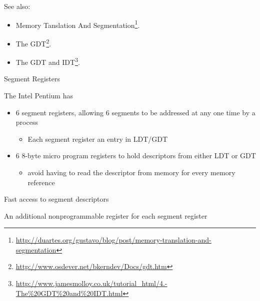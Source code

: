 See also:
\begin{itemize}
\item Memory Tanslation And Segmentation\footnote{\url{http://duartes.org/gustavo/blog/post/memory-translation-and-segmentation}}.
\item The GDT\footnote{\url{http://www.osdever.net/bkerndev/Docs/gdt.htm}}.
\item The GDT and IDT\footnote{\url{http://www.jamesmolloy.co.uk/tutorial_html/4.-The\%20GDT\%20and\%20IDT.html}}.
\end{itemize}

\begin{frame}{Segment Registers}
  \begin{iblock}{The Intel Pentium has}
    \begin{itemize}
    \item \alert{6 segment registers}, allowing 6 segments to be addressed at
      any one time by a process
      \begin{itemize}
      \item Each segment register {\pright} an entry in LDT/GDT
      \end{itemize}
    \item \alert{6 8-byte micro program registers} to hold descriptors from either LDT or GDT
      \begin{itemize}
      \item avoid having to read the descriptor from memory for every memory reference
      \end{itemize}
    \end{itemize}
  \end{iblock}
  \begin{center}
     
  \end{center}

\end{frame}

\begin{frame}{Fast access to segment descriptors}
  \begin{iblock}{An additional nonprogrammable register for each segment register}
    \begin{center}
    \end{center}
  \end{iblock}
\end{frame}

